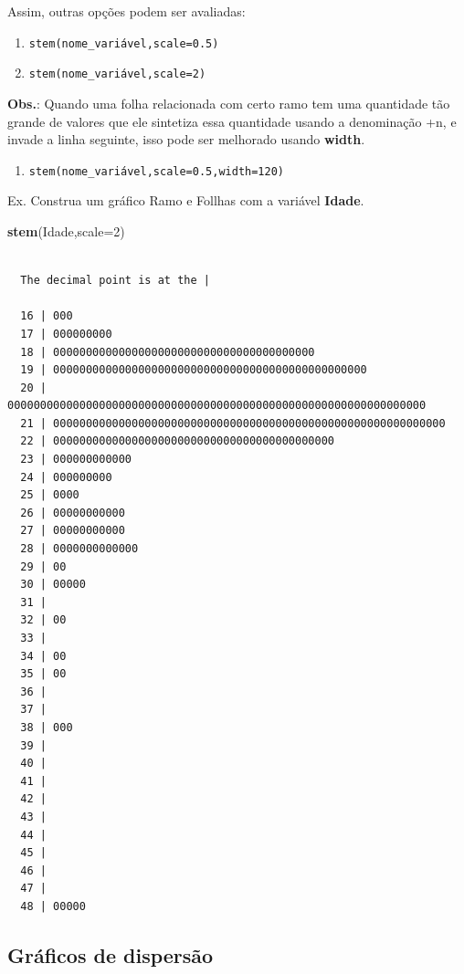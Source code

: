\documentclass[12pt,brazil,oneside]{book}
\newenvironment{Shaded}{\begin{snugshade}}{\end{snugshade}}
\newcommand{\DataTypeTok}[1]{\textcolor[rgb]{0.13,0.29,0.53}{#1}}
\newcommand{\DecValTok}[1]{\textcolor[rgb]{0.00,0.00,0.81}{#1}}
\newcommand{\KeywordTok}[1]{\textcolor[rgb]{0.13,0.29,0.53}{\textbf{#1}}}
\newcommand{\NormalTok}[1]{#1}
\providecommand{\tightlist}{%
  \setlength{\itemsep}{0pt}\setlength{\parskip}{0pt}}
\begin{document}
Assim, outras opções podem ser avaliadas:

\begin{enumerate}
\def\labelenumi{\alph{enumi})}
\item
  \texttt{stem(nome\_variável,scale=0.5)}
\item
  \texttt{stem(nome\_variável,scale=2)}
\end{enumerate}

\textbf{Obs.}: Quando uma folha relacionada com certo ramo tem uma quantidade tão grande de valores que ele sintetiza essa quantidade usando a denominação +n, e invade a linha seguinte, isso pode ser melhorado usando \textbf{width}.

\begin{enumerate}
\def\labelenumi{\alph{enumi})}
\setcounter{enumi}{2}
\tightlist
\item
  \texttt{stem(nome\_variável,scale=0.5,width=120)}
\end{enumerate}

Ex. Construa um gráfico Ramo e Follhas com a variável \textbf{Idade}.

\begin{Shaded}
\begin{Highlighting}[]
\KeywordTok{stem}\NormalTok{(Idade,}\DataTypeTok{scale=}\DecValTok{2}\NormalTok{)}
\end{Highlighting}
\end{Shaded}

\begin{verbatim}

  The decimal point is at the |

  16 | 000
  17 | 000000000
  18 | 0000000000000000000000000000000000000000
  19 | 000000000000000000000000000000000000000000000000
  20 | 0000000000000000000000000000000000000000000000000000000000000000
  21 | 000000000000000000000000000000000000000000000000000000000000
  22 | 0000000000000000000000000000000000000000000
  23 | 000000000000
  24 | 000000000
  25 | 0000
  26 | 00000000000
  27 | 00000000000
  28 | 0000000000000
  29 | 00
  30 | 00000
  31 | 
  32 | 00
  33 | 
  34 | 00
  35 | 00
  36 | 
  37 | 
  38 | 000
  39 | 
  40 | 
  41 | 
  42 | 
  43 | 
  44 | 
  45 | 
  46 | 
  47 | 
  48 | 00000
\end{verbatim}

\hypertarget{graficos-de-dispersao}{%
\subsection{Gráficos de dispersão}\label{graficos-de-dispersao}}
\end{document}
